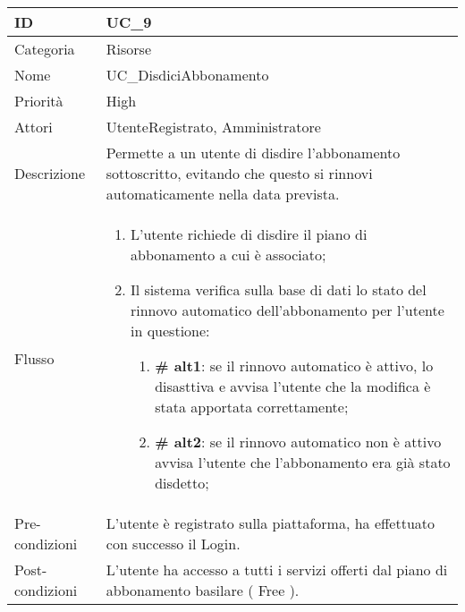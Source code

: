 \begin{center}
\begin{tabular}{ |p{2cm}|p{13cm}|  }
\hline
ID & UC\_9 \\\hline
Categoria & Risorse\\\hline
Nome & UC\_DisdiciAbbonamento\\\hline
Priorità & High \\\hline
Attori &  UtenteRegistrato, Amministratore \\\hline
Descrizione & Permette a un utente di disdire l'abbonamento sottoscritto, evitando che questo si rinnovi automaticamente nella data prevista.\\\hline
Flusso &  	\begin{enumerate}
			\item L'utente richiede di disdire il piano di abbonamento a cui è associato;
			\item Il sistema verifica sulla base di dati lo stato del rinnovo automatico dell'abbonamento per l'utente in questione:
			\begin{enumerate}[  ]
				\item \textbf{\# alt1}: se il rinnovo automatico è attivo, lo disasttiva e avvisa l'utente che la modifica è stata apportata correttamente;
				\item \textbf{\# alt2}: se il rinnovo automatico non è attivo avvisa l'utente che l'abbonamento era già stato disdetto;
			\end{enumerate}
		\end{enumerate}\\\hline
Pre-condizioni & L'utente è registrato sulla piattaforma, ha effettuato con successo il Login.\\\hline
Post-condizioni &  L'utente ha accesso a tutti i servizi offerti dal piano di abbonamento basilare ( Free ).\\\hline
\end{tabular}
\label{table_use_case:9}\newline


\end{center}
